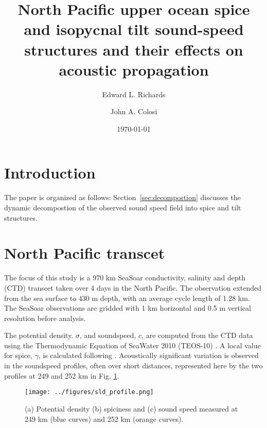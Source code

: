 \documentclass[preprint]{JASA}
\begin{document}
\title[Mixed layer tilt and spice]{North Pacific upper ocean spice and isopycnal tilt sound-speed structures and their effects on acoustic propagation}
\author{Edward L. Richards}
\author{John A. Colosi}


\date{\today}


\begin{abstract}

\end{abstract}

\maketitle

\section{\label{sec:intro} Introduction}

The paper is organized as follows: Section~\ref{sec:decompostion} discusses the dynamic decompostion of the observed sound speed field into spice and tilt structures.

\section{North Pacific transcet}
The focus of this study is a 970 km SeaSoar conductivity, salinity and depth (CTD) transcet taken over 4 days in the North Pacific. The observation extended from the sea surface to 430 m depth, with an average cycle length of 1.28 km. The SeaSoar observations are gridded with 1 km horizontal and 0.5 m vertical resolution before analysis.

The potential density. $\sigma$, and soundspeed, $c$, are computed from the CTD data using the Thermodynamic Equation of SeaWater 2010 (TEOS-10) \cite{TEOS-10}. A local value for spice, $\gamma$, is calculated following \cite{klymak2015spice}. Acoustically significant variation is observed in the soundspeed profiles, often over short distances, represented here by the two profiles at 249 and 252 km in Fig. \ref{fig:profiles}.

\begin{figure}
\texttt{[image: ../figures/sld\_profile.png]}
    \caption{\label{fig:profiles}{(a) Potential density (b) spiciness and (c) sound speed measured at 249 km (blue curves) and 252 km (orange curves).}}
\end{figure}
\end{document}

